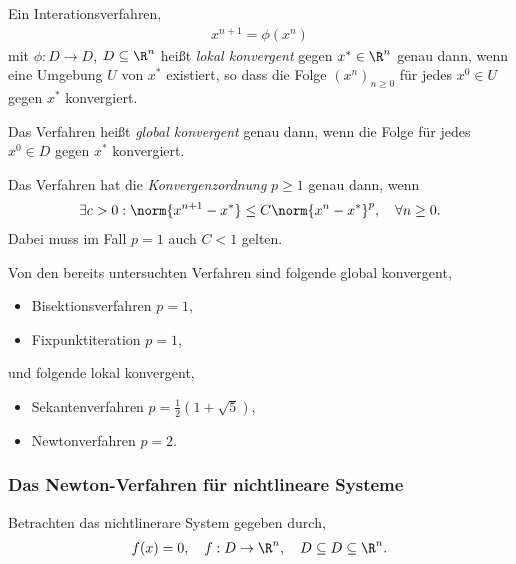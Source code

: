 \begin{defn}
\label{defn:5.5}
Ein Interationsverfahren,
\begin{align*}
x^{n+1} = \phi(x^n)
\end{align*}
mit $\phi: D\to D$, $D\subseteq \R^n$ heißt \emph{lokal konvergent} gegen
$x^*\in\R^n$ genau dann, wenn eine Umgebung $U$ von $x^*$ existiert, so dass
die Folge $(x^n)_{n\ge 0}$ für jedes $x^0\in U$ gegen $x^*$ konvergiert.

Das Verfahren heißt \emph{global konvergent} genau dann, wenn die Folge für
jedes $x^0\in D$ gegen $x^*$ konvergiert.

Das Verfahren hat die \emph{Konvergenzordnung} $p\ge 1$ genau dann, wenn
\begin{align*}
\exists c > 0 : \norm{x^{n+1}-x^*} \le C\norm{x^n-x^*}^p,\quad \forall n\ge 0.
\end{align*}
Dabei muss im Fall $p=1$ auch $C<1$ gelten.\fishhere
\end{defn}

\begin{bspn}
Von den bereits untersuchten Verfahren sind folgende global konvergent,
\begin{itemize}[label=-]
  \item Bisektionsverfahren $p=1$,
  \item Fixpunktiteration $p=1$,
\end{itemize}
und folgende lokal konvergent,
\begin{itemize}[label=-]
  \item Sekantenverfahren $p=\frac{1}{2}\left(1+\sqrt{5}\right)$,
  \item Newtonverfahren $p=2$.\bsphere
\end{itemize}
\end{bspn}

\subsubsection{Das Newton-Verfahren für nichtlineare Systeme}

Betrachten das nichtlinerare System gegeben durch,
\begin{align*}
f(x) = 0,\quad f: D\to \R^n,\quad D\subseteq D\subseteq \R^n.
\end{align*}

